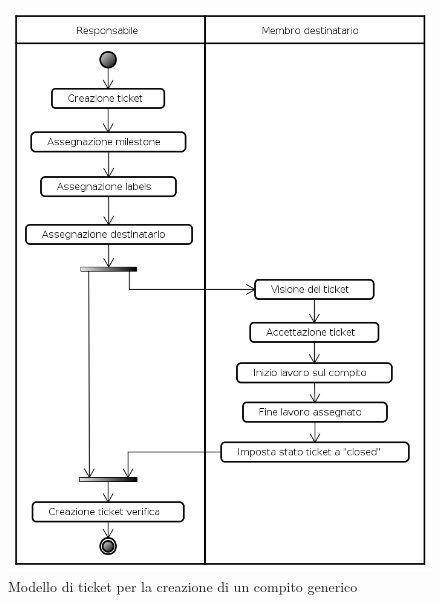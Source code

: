 \begin{figure}[h!]
	\centering
	\includegraphics[scale=0.5]{./content/Immagini/Creazione_Compito}
	\caption{Modello di ticket per la creazione di un compito generico}
	\label{creazione_ticketstd}
\end{figure}

